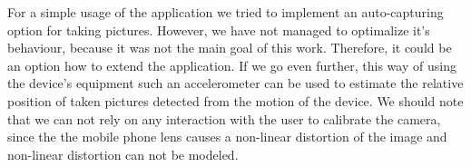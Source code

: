 For a simple usage of the application we tried to implement an auto-capturing option for taking pictures.
However, we have not managed to optimalize it's behaviour, because it was not the main goal of this work. 
Therefore, it could be an option how to extend the application.
If we go even further, this way of using the device's equipment such an accelerometer can be used to estimate the relative position of taken pictures detected from the motion of the device.
We should note that we can not rely on any interaction with the user to calibrate the camera, since the the mobile phone lens causes a non-linear distortion of the image and non-linear distortion can not be modeled.




